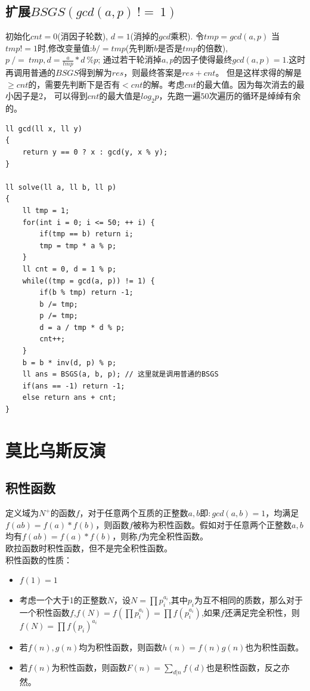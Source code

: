 \subsection{扩展$BSGS(gcd(a, p) \ !=\  1)$}

初始化$cnt = 0$(消因子轮数), $d = 1$(消掉的$gcd$乘积). 令$tmp = gcd(a, p)$ 当$tmp != 1$时,修改变量值:$b /= tmp$(先判断$b$是否是$tmp$的倍数), $p \ /= \ tmp, d = \frac{a}{tmp} * d \ \% p$; 通过若干轮消掉$a, p$的因子使得最终$gcd(a, p) = 1.$这时再调用普通的$BSGS$得到解为$res$，则最终答案是$res + cnt$。 但是这样求得的解是$\geq cnt$的，需要先判断下是否有$<cnt$的解。考虑$cnt$的最大值。因为每次消去的最小因子是$2$， 可以得到$cnt$的最大值是$log_2p$，先跑一遍$50$次遍历的循环是绰绰有余的。
\begin{lstlisting}
ll gcd(ll x, ll y)
{
    return y == 0 ? x : gcd(y, x % y);
}

ll solve(ll a, ll b, ll p)
{
    ll tmp = 1;
    for(int i = 0; i <= 50; ++ i) {
        if(tmp == b) return i;
        tmp = tmp * a % p;
    }
    ll cnt = 0, d = 1 % p;
    while((tmp = gcd(a, p)) != 1) {
        if(b % tmp) return -1;
        b /= tmp;
        p /= tmp;
        d = a / tmp * d % p;
        cnt++;
    }
    b = b * inv(d, p) % p;
    ll ans = BSGS(a, b, p); // 这里就是调用普通的BSGS
    if(ans == -1) return -1;
    else return ans + cnt;
}
\end{lstlisting}

\clearpage
\section{莫比乌斯反演}

\subsection{积性函数}
定义域为$N^+$的函数$f$，对于任意两个互质的正整数$a,b即:gcd(a,b) =1$，均满足$f(ab)= f(a)*f(b)$，则函数$f$被称为积性函数。假如对于任意两个正整数$a,b$均有$f(ab) =f(a)*f(b)$，则称$f$为完全积性函数。 \\
欧拉函数时积性函数，但不是完全积性函数。 \\
积性函数的性质： \\
\begin{itemize}
\item $f(1) = 1$ \\
\item 考虑一个大于1的正整数$N$，设$N = \prod p_i^{a_i}$,其中$p_i$为互不相同的质数，那么对于一个积性函数$f$,$f(N)=f(\prod p_i^{a_i})=\prod f(p_i^{a_i})$,如果$f$还满足完全积性，则$f(N)=\prod f(p_i)^{a_i}$ \\
\item 若$f(n),g(n)$均为积性函数，则函数$h(n)=f(n)g(n)$也为积性函数。 \\
\item 若$f(n)$为积性函数，则函数$F(n)=\sum_{d|n}{}f(d)$也是积性函数，反之亦然。
\end{itemize}

